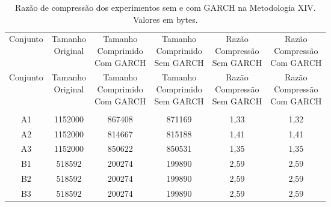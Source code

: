 \begin{center}
\begin{longtable}{cccccc}
\toprule
\rowcolor{white}
\caption[Metodologia XIV: Razão de compressão]{Razão de compressão dos
experimentos sem e com GARCH na Metodologia XIV.
Valores em bytes.} \label{Tab:razaocompressaoMet} \\
\midrule
Conjunto & \specialcell{Tamanho \\Original} & \specialcell{Tamanho
\\Comprimido\\Com GARCH} & \specialcell{Tamanho
\\Comprimido\\Sem GARCH} & \specialcell{Razão \\Compressão
\\Sem GARCH} & \specialcell{Razão \\Compressão
\\Com GARCH} \\
\midrule
\endfirsthead
\midrule
\rowcolor{white}
Conjunto & \specialcell{Tamanho \\Original} & \specialcell{Tamanho
\\Comprimido\\Com GARCH} & \specialcell{Tamanho
\\Comprimido\\Sem GARCH} & \specialcell{Razão \\Compressão
\\Sem GARCH} & \specialcell{Razão \\Compressão
\\Com GARCH} \\
\toprule
\endhead
\midrule \\ %
\endfoot
\bottomrule
\endlastfoot
    A1    & 1152000 & 867408 & 871169 & 1,33  & 1,32 \\
    A2    & 1152000 & 814667 & 815188 & 1,41  & 1,41 \\
    A3    & 1152000 & 850622 & 850531 & 1,35  & 1,35 \\
    B1    & 518592 & 200274 & 199890 & 2,59  & 2,59 \\
    B2    & 518592 & 200274 & 199890 & 2,59  & 2,59 \\
    B3    & 518592 & 200274 & 199890 & 2,59  & 2,59 \\

\end{longtable}
\end{center}
